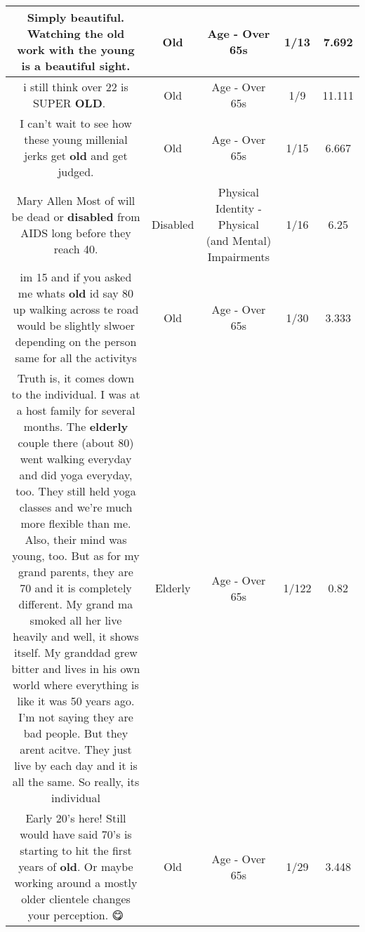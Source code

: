 \documentclass[11pt]{article}
\newlength\mylength
\begin{document}
\begin{center}
\begin{longtable}{|C{.65\mylength}|C{.30\mylength}|C{.12\mylength}|C{.12\mylength}|C{.12\mylength}|}
  \small Simply beautiful. Watching the \textbf{old} work with the young is a beautiful sight.\normalsize   & Old & Age - Over 65s & 1/13 & 7.692 \\  \hline
  \small i still think over 22 is SUPER \textbf{OLD}. 👴👨👵\normalsize   & Old & Age - Over 65s & 1/9 & 11.111 \\  \hline
  \small I can't wait to see how these young millenial jerks get \textbf{old} and get judged.\normalsize   & Old & Age - Over 65s & 1/15 & 6.667 \\  \hline
  \small Mary Allen Most of will be dead or \textbf{disabled} from AIDS long before they reach 40.\normalsize   & Disabled & Physical Identity - Physical (and Mental) Impairments & 1/16 & 6.25 \\  \hline
  \small im 15 and if you asked me whats \textbf{old} id say 80 up walking across te road would be slightly slwoer depending on the person same for all the activitys\normalsize   & Old & Age - Over 65s & 1/30 & 3.333 \\  \hline
  \small Truth is, it comes down to the individual. I was at a host family for several months. The \textbf{elderly} couple there (about 80) went walking everyday and did yoga everyday, too. They still held yoga classes and we're much more flexible than me. Also, their mind was young, too.  But as for my grand parents, they are 70 and it is completely different. My grand ma smoked all her live heavily and well, it shows itself. My granddad grew bitter and lives in his own world where everything is like it was 50 years ago. I'm not saying they are bad people. But they arent acitve. They just live by each day and it is all the same. So really, its individual\normalsize   & Elderly & Age - Over 65s & 1/122 & 0.82 \\  \hline
  \small Early 20's here! Still would have said 70's is starting to hit the first years of \textbf{old}. Or maybe working around a mostly older clientele changes your perception. 😋\normalsize   & Old & Age - Over 65s & 1/29 & 3.448 \\  \hline

\end{longtable}
\end{center}
\end{document}

